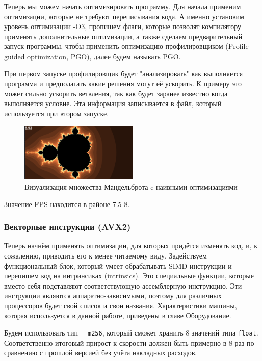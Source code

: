 \documentclass[12pt,a4paper]{article}
\begin{document}
Теперь мы можем начать оптимизировать программу. Для начала применим оптимизации, которые не требуют переписывания кода. А именно установим уровень оптимизации -O3, пропишем флаги, которые позволят компилятору применять дополнительные оптимизации, а также сделаем предварительный запуск программы, чтобы применить оптимизацию профилировщиком (Profile-guided optimization, PGO), далее будем называть PGO.

При первом запуске профилировщик будет "анализировать" как выполняется программа и предполагать какие решения могут её ускорить. К примеру это может сильно ускорить ветвления, так как будет заранее известно когда выполняется условие. Эта информация записывается в файл, который используется при втором запуске.

\begin{figure}[ht!]
    \centering
    \includegraphics[width=0.5\textwidth]{mand_O3.png}
    \caption{Визуализация множества Мандельброта c наивными оптимизациями}
    \label{fig:mand_O3}
\end{figure}

Значение FPS находится в районе 7.5-8.

\subsubsection{Векторные инструкции (AVX2)} 

Теперь начнём применять оптимизации, для которых придётся изменять код, и, к сожалению, приводить его к менее читаемому виду. Задействуем функциональный блок, который умеет обрабатывать SIMD-инструкции и перепишем код на интринсиках (intrinsics). Это специальные функции, которые вместо себя подставляют соответствующую ассемблерную инструкцию. Эти инструкции являются аппаратно-зависимыми, поэтому для различных процессоров будет свой список и свои названия. Характеристики машины, которая используется в данной работе, приведены в главе Оборудование.

Будем использовать тип \verb|__m256|, который сможет хранить 8 значений типа \verb|float|. Соответственно итоговый прирост к скорости должен быть примерно в 8 раз по сравнению с прошлой версией без учёта накладных расходов.
\end{document}
